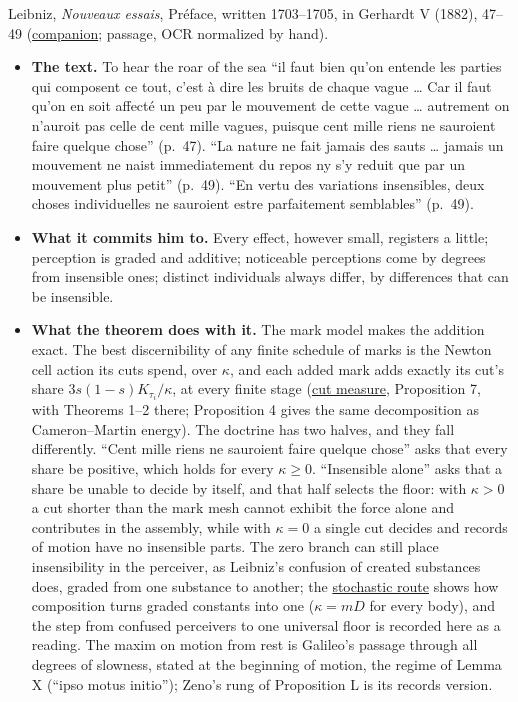 \documentclass[11pt,a4paper]{article}
\newcommand{\tightlist}{\setlength{\itemsep}{0pt}\setlength{\parskip}{0pt}}
\begin{document}
Leibniz, \emph{Nouveaux essais}, Préface, written 1703--1705, in
Gerhardt V (1882), 47--49
(\href{../docs/classics/Leibniz_NouveauxEssais_Preface_Gerhardt5_OCR.md}{companion};
passage, OCR normalized by hand).

\begin{itemize}
\tightlist
\item
  \textbf{The text.} To hear the roar of the sea ``il faut bien qu'on
  entende les parties qui composent ce tout, c'est à dire les bruits de
  chaque vague \ldots{} Car il faut qu'on en soit affecté un peu par le
  mouvement de cette vague \ldots{} autrement on n'auroit pas celle de
  cent mille vagues, puisque cent mille riens ne sauroient faire quelque
  chose'' (p.~47). ``La nature ne fait jamais des sauts \ldots{} jamais
  un mouvement ne naist immediatement du repos ny s'y reduit que par un
  mouvement plus petit'' (p.~49). ``En vertu des variations insensibles,
  deux choses individuelles ne sauroient estre parfaitement semblables''
  (p.~49).
\item
  \textbf{What it commits him to.} Every effect, however small,
  registers a little; perception is graded and additive; noticeable
  perceptions come by degrees from insensible ones; distinct individuals
  always differ, by differences that can be insensible.
\item
  \textbf{What the theorem does with it.} The mark model makes the
  addition exact. The best discernibility of any finite schedule of
  marks is the Newton cell action its cuts spend, over \(\kappa\), and
  each added mark adds exactly its cut's share
  \(3s(1-s)K_{\tau_i}/\kappa\), at every finite stage
  (\href{cut-measure-newton.md}{cut measure}, Proposition 7, with
  Theorems 1--2 there; Proposition 4 gives the same decomposition as
  Cameron--Martin energy). The doctrine has two halves, and they fall
  differently. ``Cent mille riens ne sauroient faire quelque chose''
  asks that every share be positive, which holds for every
  \(\kappa\ge0\). ``Insensible alone'' asks that a share be unable to
  decide by itself, and that half selects the floor: with \(\kappa>0\) a
  cut shorter than the mark mesh cannot exhibit the force alone and
  contributes in the assembly, while with \(\kappa=0\) a single cut
  decides and records of motion have no insensible parts. The zero
  branch can still place insensibility in the perceiver, as Leibniz's
  confusion of created substances does, graded from one substance to
  another; the
  \href{composition-universality.md\#continuous-free-paths-and-ultimate-velocity}{stochastic
  route} shows how composition turns graded constants into one
  (\(\kappa=mD\) for every body), and the step from confused perceivers
  to one universal floor is recorded here as a reading. The maxim on
  motion from rest is Galileo's passage through all degrees of slowness,
  stated at the beginning of motion, the regime of Lemma X (``ipso motus
  initio''); Zeno's rung of Proposition L is its records version.
\end{itemize}
\end{document}
